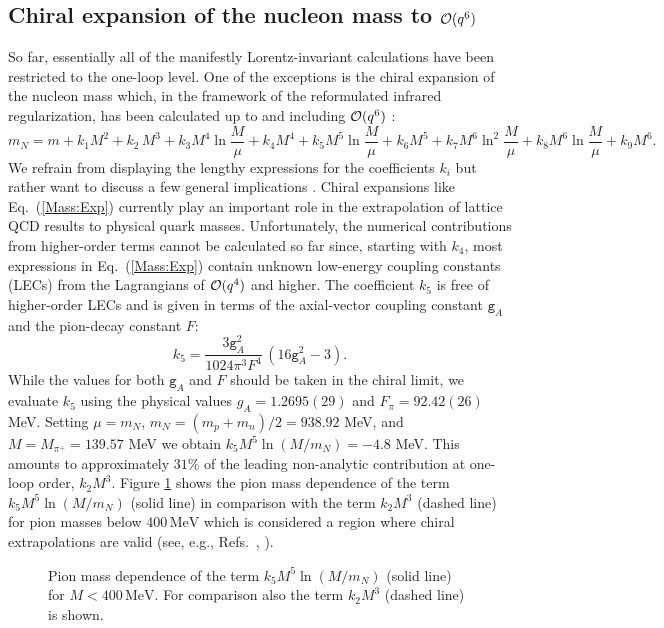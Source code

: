 \documentclass[twoside,12pt]{article}
\begin{document}
\subsection{Chiral expansion of the nucleon mass to ${\cal O}(q^6)$}
    So far, essentially all of the manifestly Lorentz-invariant calculations have been
restricted to the one-loop level.
   One of the exceptions is the chiral expansion of the nucleon mass which,
in the framework of the reformulated infrared regularization, has been calculated
up to and including ${\cal O}(q^6)$
\cite{Schindler:2006ha,Schindler:2007dr}:
\begin{equation}
\label{Mass:Exp}
    m_N = m +k_1 M^2 +k_2 \,M^3 +k_3 M^4 \ln\frac{M}{\mu}
+ k_4 M^4  + k_5 M^5\ln\frac{M}{\mu} + k_6 M^5 + k_7
M^6 \ln^2\frac{M}{\mu}+ k_8 M^6 \ln\frac{M}{\mu} + k_9 M^6.
\end{equation}
   We refrain from displaying the lengthy expressions for the coefficients
$k_i$ but rather want to discuss a few general implications \cite{Schindler:2007dr}.
   Chiral expansions like Eq.~(\ref{Mass:Exp}) currently play an important
role in the extrapolation of lattice QCD results to physical quark
masses.
   Unfortunately, the numerical contributions from higher-order terms cannot be
calculated so far since, starting with $k_4$, most expressions in
Eq.~(\ref{Mass:Exp}) contain unknown low-energy coupling
constants (LECs) from the Lagrangians of ${\cal O}(q^4)$ and
higher.
   The coefficient $k_5$ is free of higher-order LECs
and is given in terms of the axial-vector coupling constant
$\texttt{g}_A$ and the pion-decay constant $F$:
\begin{displaymath}
 k_5 = \frac{3 \texttt{g}_A^2}{1024\pi^3 F^4}\,\left(16\texttt{g}_A^2-3\right).
 \end{displaymath}
   While the values for both $\texttt{g}_A$ and $F$ should be taken in the chiral
limit, we evaluate $k_5$ using the physical values $g_A=1.2695(29)$
and $F_\pi=92.42(26)$ MeV.
   Setting $\mu=m_N$, $m_N=(m_p+m_n)/2=938.92$ MeV, and $M=M_{\pi^+}=139.57$ MeV
we obtain $k_5 M^5 \ln(M/m_N) = -4.8$ MeV.
   This amounts to approximately $31$\% of the leading non-analytic contribution
at one-loop order, $k_2 M^3$.
   Figure \ref{Mass:k2k5Low} shows the pion mass dependence of the term
$k_5 M^5 \ln(M/m_N)$ (solid line) in comparison with the term $k_2
M^3$ (dashed line) for pion masses below $400\,\mbox{MeV}$
which is considered a region where chiral extrapolations are valid
(see, e.g., Refs.~\cite{Meissner:2005ba}, \cite{Djukanovic:2006xc}).
\begin{figure}[t]
\begin{center}
\end{center}
\caption{Pion mass dependence of the term $k_5 M^5 \ln(M/m_N)$
(solid line) for $M<400\,\mbox{MeV}$. For comparison also the term
$k_2 M^3$ (dashed line) is shown.\label{Mass:k2k5Low}}
\end{figure}
\end{document}
